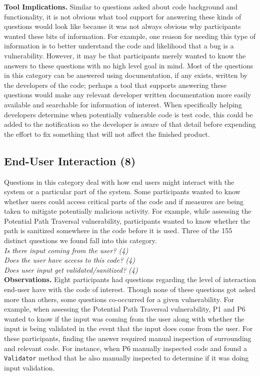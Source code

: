 \documentclass[conference]{IEEEtran}
\begin{document}
\noindent\textbf{Tool Implications.}
Similar to questions asked about code background and functionality, it is not obvious what tool support for answering these kinds of questions would look like because it was not always obvious why participants wanted these bits of information. 
For example, one reason for needing this type of information is to better understand the code and likelihood that a bug is a vulnerability. 
However, it may be that participants merely wanted to know the answers to these questions with no high level goal in mind.
Most of the questions in this category can be answered using documentation, if any exists, written by the developers of the code; perhaps a tool that supports answering these questions would make any relevant developer written documentation more easily available and searchable for information of interest.
When specifically helping developers determine when potentially vulnerable code is test code, this could be added to the notification so the developer is aware of that detail before expending the effort to fix something that will not affect the finished product.



\noindent\subsection{\textbf{End-User Interaction (8)}}
\label{eui}


Questions in this category deal with how end users might interact with the system or a particular part of the system. 
Some participants wanted to know whether users could access critical parts of the code and if measures are being taken to mitigate potentially malicious activity. 
For example, while assessing the Potential Path Traversal vulnerability, participants wanted to know whether the path is sanitized somewhere in the code before it is used.
Three of the 155 distinct questions we found fall into this category.
\\

\noindent\emph{Is there input coming from the user? (4)} \\
\emph{Does the user have access to this code? (4)} \\
\emph{Does user input get validated/sanitized? (4)} \\


\noindent\textbf{Observations.}
Eight participants had questions regarding the level of interaction end-user have with the code of interest. 
Though none of these questions got asked more than others, some questions co-occurred for a given vulnerability.
For example, when assessing the Potential Path Traversal vulnerability, P1 and P6 wanted to know if the input was coming from the user along with whether the input is being validated in the event that the input does come from the user.
For these participants, finding the answer required manual inspection of surrounding and relevant code. 
For instance, when P6 manually inspected code and found a \texttt{Validator} method that he also manually inspected to determine if it was doing input validation.
\end{document}
